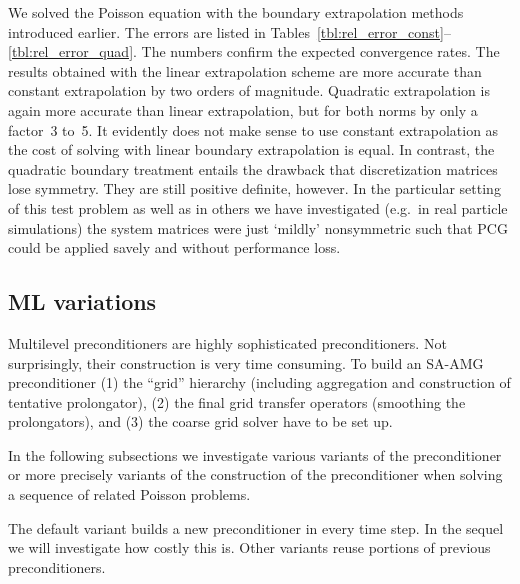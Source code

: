 \documentclass[a4paper,10pt,3p,preprint,pdftex]{elsarticle}
\begin{document}
We solved the Poisson equation with the boundary extrapolation methods
introduced earlier.  The errors are listed in
Tables~\ref{tbl:rel_error_const}--\ref{tbl:rel_error_quad}.  The numbers
confirm the expected convergence rates.  The results obtained with the
linear extrapolation scheme are more accurate than constant
extrapolation by two orders of magnitude.  Quadratic extrapolation is
again more accurate than linear extrapolation, but for both norms by
only a factor~3 to~5.  It evidently does not make sense to use constant
extrapolation as the cost of solving with linear boundary extrapolation
is equal.  In contrast, the quadratic boundary treatment entails the
drawback that discretization matrices lose symmetry.  They are still
positive definite, however.  In the particular setting of this test
problem as well as in others we have investigated (e.g.\ in real
particle simulations) the system matrices were just `mildly'
nonsymmetric such that PCG could be applied savely and without
performance loss.



\subsection{ML variations}\label{sec:ml_var}

Multilevel preconditioners are highly sophisticated preconditioners.
Not surprisingly, their construction is very time consuming.  To build
an SA-AMG preconditioner (1) the ``grid'' hierarchy (including
aggregation and construction of tentative prolongator), (2) the final
grid transfer operators (smoothing the prolongators), and (3) the coarse
grid solver have to be set up.

In the following subsections we investigate various variants of the
preconditioner or more precisely variants of the construction of the
preconditioner when solving a sequence of related Poisson problems.

The default variant builds a new preconditioner in every time step.  In
the sequel we will investigate how costly this is.  Other variants reuse
portions of previous preconditioners.
\end{document}
